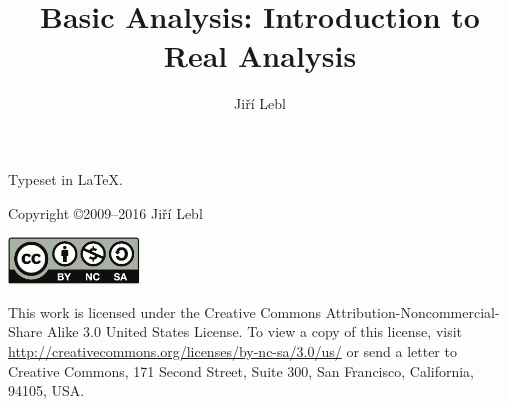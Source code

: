 \documentclass[12pt]{book}
\author{Ji\v{r}\'i Lebl}
\title{Basic Analysis: Introduction to Real Analysis}
\begin{document}
\ifpdf
\fi
\newlength{\centeroffset}
\setlength{\centeroffset}{-0.5\oddsidemargin}
\addtolength{\centeroffset}{0.5\evensidemargin}
\thispagestyle{empty}
\noindent\hspace*{\centeroffset}

\noindent\hspace*{\centeroffset}



\pagebreak

\vspace*{\fill}

\noindent
Typeset in \LaTeX.


\bigskip

\noindent
Copyright \copyright 2009--2016 Ji{\v r}\'i Lebl


\bigskip

\noindent
\includegraphics[width=1.38in]{license}

\bigskip

\noindent
This work is licensed under the Creative Commons
Attribution-Non\-commercial-Share Alike 3.0 United States License. To view a copy of this license, visit
\url{http://creativecommons.org/licenses/by-nc-sa/3.0/us/} or send a letter to Creative Commons, 171 Second Street, Suite 300, San Francisco, California, 94105, USA.
\end{document}
